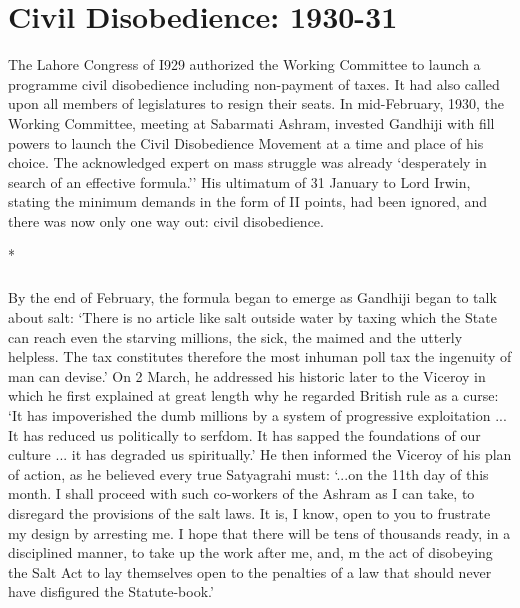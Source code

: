 \cleardoublepage
\chapter{Civil Disobedience: 1930-31}

The Lahore Congress of I929 authorized the Working Committee to launch a programme civil disobedience including non-payment of taxes. It had also called upon all members of legislatures to resign their seats. In mid-February, 1930, the Working Committee, meeting at Sabarmati Ashram, invested Gandhiji with fill powers to launch the Civil Disobedience Movement at a time and place of his choice. The acknowledged expert on mass struggle was already `desperately in search of an effective formula.'' His ultimatum of 31 January to Lord Irwin, stating the minimum demands in the form of II points, had been ignored, and there was now only one way out: civil disobedience.

\begin{center}*\end{center}

\paragraph*{}


By the end of February, the formula began to emerge as Gandhiji began to talk about salt: `There is no article like salt outside water by taxing which the State can reach even the starving millions, the sick, the maimed and the utterly helpless. The tax constitutes therefore the most inhuman poll tax the ingenuity of man can devise.' On 2 March, he addressed his historic later to the Viceroy in which he first explained at great length why he regarded British rule as a curse: `It has impoverished the dumb millions by a system of progressive exploitation ... It has reduced us politically to serfdom. It has sapped the foundations of our culture ... it has degraded us spiritually.' He then informed the Viceroy of his plan of action, as he believed every true Satyagrahi must: `...on the 11th day of this month. I shall proceed with such co-workers of the Ashram as I can take, to disregard the provisions of the salt laws. It is, I know, open to you to frustrate my design by arresting me. I hope that there will be tens of thousands ready, in a disciplined manner, to take up the work after me, and, m the act of disobeying the Salt Act to lay themselves open to the penalties of a law that should never have disfigured the Statute-book.' 

